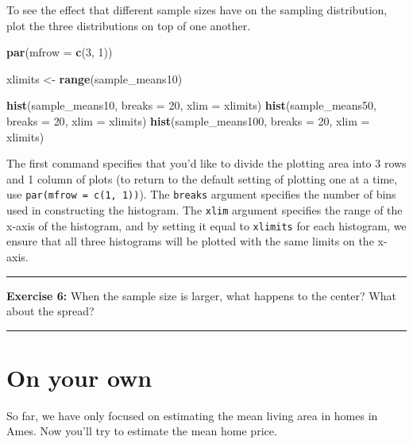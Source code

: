 \documentclass[]{book}
\newenvironment{Shaded}{\begin{snugshade}}{\end{snugshade}}
\newcommand{\DataTypeTok}[1]{\textcolor[rgb]{0.13,0.29,0.53}{#1}}
\newcommand{\DecValTok}[1]{\textcolor[rgb]{0.00,0.00,0.81}{#1}}
\newcommand{\KeywordTok}[1]{\textcolor[rgb]{0.13,0.29,0.53}{\textbf{#1}}}
\newcommand{\NormalTok}[1]{#1}
\newcommand{\StringTok}[1]{\textcolor[rgb]{0.31,0.60,0.02}{#1}}
\theoremstyle{definition}
\theoremstyle{definition}
\theoremstyle{definition}
\theoremstyle{remark}
\begin{document}
To see the effect that different sample sizes have on the sampling
distribution, plot the three distributions on top of one another.

\begin{Shaded}
\begin{Highlighting}[]
\KeywordTok{par}\NormalTok{(}\DataTypeTok{mfrow =} \KeywordTok{c}\NormalTok{(}\DecValTok{3}\NormalTok{, }\DecValTok{1}\NormalTok{))}

\NormalTok{xlimits <-}\StringTok{ }\KeywordTok{range}\NormalTok{(sample_means10)}

\KeywordTok{hist}\NormalTok{(sample_means10, }\DataTypeTok{breaks =} \DecValTok{20}\NormalTok{, }\DataTypeTok{xlim =}\NormalTok{ xlimits)}
\KeywordTok{hist}\NormalTok{(sample_means50, }\DataTypeTok{breaks =} \DecValTok{20}\NormalTok{, }\DataTypeTok{xlim =}\NormalTok{ xlimits)}
\KeywordTok{hist}\NormalTok{(sample_means100, }\DataTypeTok{breaks =} \DecValTok{20}\NormalTok{, }\DataTypeTok{xlim =}\NormalTok{ xlimits)}
\end{Highlighting}
\end{Shaded}

The first command specifies that you'd like to divide the plotting area
into 3 rows and 1 column of plots (to return to the default setting of
plotting one at a time, use \texttt{par(mfrow\ =\ c(1,\ 1))}). The
\texttt{breaks} argument specifies the number of bins used in
constructing the histogram. The \texttt{xlim} argument specifies the
range of the x-axis of the histogram, and by setting it equal to
\texttt{xlimits} for each histogram, we ensure that all three histograms
will be plotted with the same limits on the x-axis.

\begin{center}\rule{0.5\linewidth}{\linethickness}\end{center}

\textbf{Exercise 6:} When the sample size is larger, what happens to the
center? What about the spread?

\begin{center}\rule{0.5\linewidth}{\linethickness}\end{center}

\hypertarget{on-your-own-3}{%
\section{On your own}\label{on-your-own-3}}

So far, we have only focused on estimating the mean living area in homes
in Ames. Now you'll try to estimate the mean home price.
\end{document}
